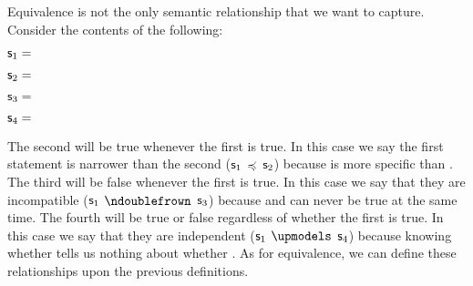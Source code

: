 \documentclass[11pt,letterpaper,fleqn]{memoir} %
\begin{document}
Equivalence is not the only semantic relationship that we want to capture. Consider the contents of the following:
\begin{description}
	\item $\mathsf{s}_1=$
	\item $\mathsf{s}_2=$
	\item $\mathsf{s}_3=$
	\item $\mathsf{s}_4=$
\end{description}
The second will be true whenever the first is true. In this case we say the first statement is narrower than the second ($\mathsf{s}_1$ $\preccurlyeq$ $\mathsf{s}_2$) because  is more specific than . The third will be false whenever the first is true. In this case we say that they are incompatible ($\mathsf{s}_1$ $\ncomp$ $\mathsf{s}_3$) because  and  can never be true at the same time. The fourth will be true or false regardless of whether the first is true. In this case we say that they are independent ($\mathsf{s}_1$ $\indep$ $\mathsf{s}_4$) because knowing whether  tells us nothing about whether . As for equivalence, we can define these relationships upon the previous definitions.
\end{document}

